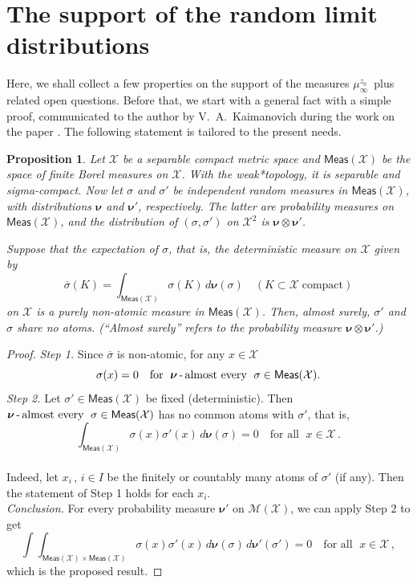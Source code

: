 \documentclass[12pt]{amsart}
\numberwithin{theorem}{section}
\newtheorem{pro}[theorem]{Proposition}%
\theoremstyle{definition}
\begin{document}
\section{The support of the random limit distributions}\label{sec:properties}

Here, we shall collect a few properties on the support of the measures $\mu_{\infty}^{z_0}\,$ plus related 
open questions. Before that, we start with a general fact with a simple proof, communicated
to the author by V.~A.~Kaimanovich during the work on the paper \cite{KW}. The following 
statement is tailored to the present needs.

\begin{pro}\label{pro:nonatomic}
Let $\mathcal{X}$ be a separable compact metric space and $\mathsf{Meas}(\mathcal{X})$ 
be the space of finite Borel measures on $\mathcal{X}$. With the weak*topology, it is separable 
and sigma-compact. Now let $\sigma$ and $\sigma'$ be independent random measures in 
$\mathsf{Meas}(\mathcal{X})$,
with distributions $\boldsymbol{\nu}$ and $\boldsymbol{\nu}'$, respectively. 
The latter are probability measures on $\mathsf{Meas}(\mathcal{X})$, and the distribution of
$(\sigma,\sigma')$ on $\mathcal{X}^2$ is $\boldsymbol{\nu} \otimes \boldsymbol{\nu}'$.

Suppose that the expectation  of $\sigma$,  
that is, the deterministic measure on $\mathcal{X}$ given by
$$
\overline{\sigma}(K) = \int_{\mathsf{Meas}(\mathcal{X})} \sigma(K)\,d\boldsymbol{\nu}(\sigma) 
\quad  (K \subset \mathcal{X}\; \text{compact}) 
$$
on $\mathcal{X}$ is a purely non-atomic measure in $\mathsf{Meas}(\mathcal{X})$. Then, almost surely, 
$\sigma'$ and $\sigma$ share no atoms. 
(``Almost surely'' refers to the probability measure $\boldsymbol{\nu} \otimes \boldsymbol{\nu}'$.)
\end{pro}

\begin{proof}
\emph{Step 1.} Since $\overline{\sigma}$ is non-atomic, for any $x \in \mathcal{X}$
$$
\sigma(x) = 0 \quad \text{for }\; \boldsymbol{\nu} \text{\,-\,almost every }\; 
\sigma \in \mathsf{Meas}(\mathcal{X}). 
$$
\emph{Step 2.} Let $\sigma' \in \mathsf{Meas}(\mathcal{X})$ be fixed (deterministic). Then 
$\boldsymbol{\nu}\text{\,-\,almost every }\; \sigma \in \mathsf{Meas}(\mathcal{X})$ has no 
common atoms with $\sigma'$, that is,
$$
\int_{\mathsf{Meas}(\mathcal{X})} \sigma(x)\sigma'(x)\, d\boldsymbol{\nu}(\sigma) = 0 \quad 
\text{for all }\; x \in \mathcal{X}\,.
$$
\\[3pt]
Indeed, let $x_i\,$, $i \in I$ be the finitely or countably many atoms of $\sigma'$ (if any).
Then the statement of Step 1 holds for each $x_i$.
\\[3pt]
\emph{Conclusion.} For every probability
measure $\boldsymbol{\nu}'$ on $\mathcal{M}(\mathcal{X})$, we can apply Step 2 to get
$$
\int\!\!\!\!\int_{\mathsf{Meas}(\mathcal{X}) \times \mathsf{Meas}(\mathcal{X})} \sigma(x)\sigma'(x)\, 
d\boldsymbol{\nu}(\sigma)\, d\boldsymbol{\nu}'(\sigma') = 0 
\quad \text{for all }\; x \in \mathcal{X}\,,
$$
which is the proposed result.
\end{proof}
\end{document}
